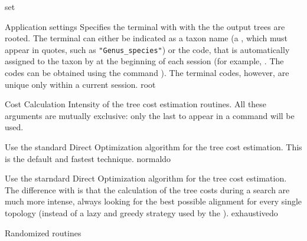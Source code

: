 \begin{command}{set}{}
\begin{arguments}
\begin{argumentgroup}{Application settings}
                {Specifies the terminal with with the the output trees are
                rooted.  The terminal can either be indicated as a taxon name (a
                \poystring, which must appear in quotes, such as
                \texttt{"Genus\_species"}) or the code, that is automatically
                assigned to the taxon by \poy at the beginning of each \poy
                session (for example, . The codes can
                be obtained using the command ).  The
                terminal codes, however, are unique only within a current
                session.}
                {root}

        \end{argumentgroup}

        \begin{argumentgroup}{Cost Calculation}
            {Intensity of the tree cost estimation routines. All these arguments
            are mutually exclusive: only the last to appear in a
             command will be used.}

                {Use the standard Direct Optimization algorithm for the tree
                cost estimation. This is the default and fastest technique.}
                {normaldo}

                {Use the starndard Direct Optimization algorithm for the tree
                cost estimation. The difference with  is
                that the calculation of the tree costs during a search are much
                more intense, always looking for the best possible alignment 
                for every single topology (instead of a lazy and greedy strategy
                used by the ).}
                {exhaustivedo}


        \end{argumentgroup}

        \begin{argumentgroup}{Randomized routines}
            {}


\end{argumentgroup}
\end{arguments}
\end{command}
